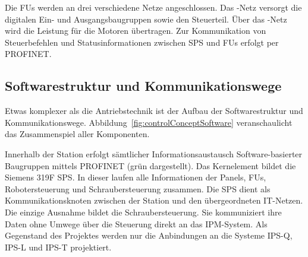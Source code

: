 Die FUs werden an drei verschiedene Netze angeschlossen. Das -Netz versorgt die digitalen Ein- und Ausgangsbaugruppen sowie den Steuerteil. Über das -Netz wird die Leistung für die Motoren übertragen. Zur Kommunikation von Steuerbefehlen und Statusinformationen zwischen SPS und FUs erfolgt per PROFINET.

\subsection{Softwarestruktur und Kommunikationswege}


Etwas komplexer als die Antriebstechnik ist der Aufbau der Softwarestruktur und Kommunikationswege. Abbildung~\ref{fig:controlConceptSoftware} veranschaulicht das Zusammenspiel aller Komponenten.

Innerhalb der Station erfolgt sämtlicher Informationsaustausch Software-basierter Baugruppen mittels PROFINET (grün dargestellt). Das Kernelement bildet die Siemens 319F SPS. In dieser laufen alle Informationen der Panels, FUs, Robotersteuerung und Schraubersteuerung zusammen.
Die SPS dient als Kommunikationsknoten zwischen der Station und den übergeordneten IT-Netzen. Die einzige Ausnahme bildet die Schraubersteuerung. Sie kommuniziert ihre Daten ohne Umwege über die Steuerung direkt an das IPM-System.
Als Gegenstand des Projektes werden nur die Anbindungen an die Systeme IPS-Q, IPS-L und IPS-T projektiert.


%

